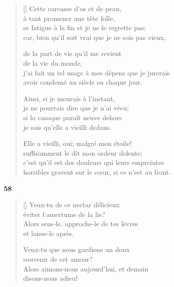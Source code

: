 \documentclass[a4paper,12pt]{book}
\begin{document}
\begin{verse}[\versewidth]
  Cette carcasse d'os et de peau, \\
  à tant promener une tête folle, \\
  se fatigue à la fin et je ne le regrette pas; \\
  car, bien qu'il soit vrai que je ne sois pas vieux,

  de la part de vie qu'il me revient \\
  de la vie du monde, \\
  j'ai fait un tel usage à mes dépens que je jurerais \\
  avoir condensé un siècle en chaque jour.

  Ainsi, si je mourais à l'instant, \\
  je ne pourrais dire que je n'ai vécu; \\
  si la casaque paraît neuve dehors \\
  je sais qu'elle a vieilli dedans.

  Elle a vieilli, oui; malgré mon étoile! \\
  suffisamment le dit mon ardeur dolente; \\
  c'est qu'il est des douleurs qui leurs empreintes \\
  horribles gravent sur le cœur, si ce n'est au front.
\end{verse}

\bigskip

\begin{center}
  \textbf{58}
\end{center}

\settowidth{\versewidth}{Alors sens-le, approche-le de tes lèvres}

\begin{verse}[\versewidth]
  Veux-tu de ce nectar délicieux \\
  éviter l'amertume de la lie? \\
  Alors sens-le, approche-le de tes lèvres \\
  et laisse-le après.

  Veux-tu que nous gardions un doux \\
  souvenir de cet amour? \\
  Alors aimons-nous aujourd'hui, et demain \\
  disons-nous adieu!
\end{verse}
\end{document}
